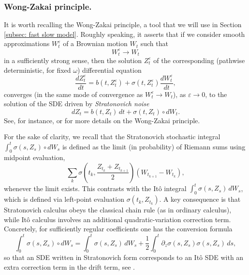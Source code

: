 \documentclass[10pt]{amsart}
\numberwithin{equation}{section}
\begin{document}
\subsubsection{Wong-Zakai principle.} It is worth recalling the Wong-Zakai principle, a tool that we will use in Section \ref{subsec: fast slow model}. Roughly speaking, it asserts that if we consider smooth approximations $W^\varepsilon_t$ of a Brownian motion $W_t$ such that
$$
W^\varepsilon_t \to W_t
$$
in a sufficiently strong sense, then the solution $Z^\varepsilon_t$ of the corresponding (pathwise deterministic, for fixed $\omega$) differential equation
$$
\frac{dZ^\varepsilon_t}{dt}= b(t,Z^\varepsilon_t)+\sigma(t,Z^\varepsilon_t) \frac{dW^\varepsilon_t}{dt},
$$
converges (in the same mode of convergence as $W^\varepsilon_t\to W_t$), as $\varepsilon\to 0$, to the solution of the SDE driven by \emph{Stratonovich noise}
$$
dZ_t=b(t,Z_t)\,dt+\sigma(t,Z_t)\circ dW_t.
$$
See, for instance, \cite[Chapter 5.2]{Karatza1991} or \cite{IkedaWatanabe1981,Twardowska1996} for more details on the Wong-Zakai principle.

For the sake of clarity, we recall that the Stratonovich stochastic integral $\int_0^t \sigma(s,Z_s)\circ dW_s$ is defined as the limit (in probability) of Riemann sums using midpoint evaluation,
$$
\sum_{k}\sigma \left(t_k,\frac{Z_{t_k}+Z_{t_{k+1}}}{2}\right)\left(W_{t_{k+1}}-W_{t_k}\right),
$$
whenever the limit exists. This contrasts with the It\^{o} integral $\int_0^t \sigma(s,Z_s)\,dW_s$, which is defined via left-point evaluation $\sigma(t_k,Z_{t_k})$. A key consequence is that Stratonovich calculus obeys the classical chain rule (as in ordinary calculus), while It\^{o} calculus involves an additional quadratic-variation correction term. Concretely, for sufficiently regular coefficients one has the conversion formula
$$
\int_0^t \sigma(s,Z_s)\circ dW_s = \int_0^t \sigma(s,Z_s)\, dW_s
+\frac{1}{2}\int_0^t \partial_z\sigma(s,Z_s) \sigma(s,Z_s)\,ds,
$$
so that an SDE written in Stratonovich form corresponds to an It\^{o} SDE with an extra correction term in the drift term, see \cite[Section 4.6]{Solin2019}. 
\end{document}
